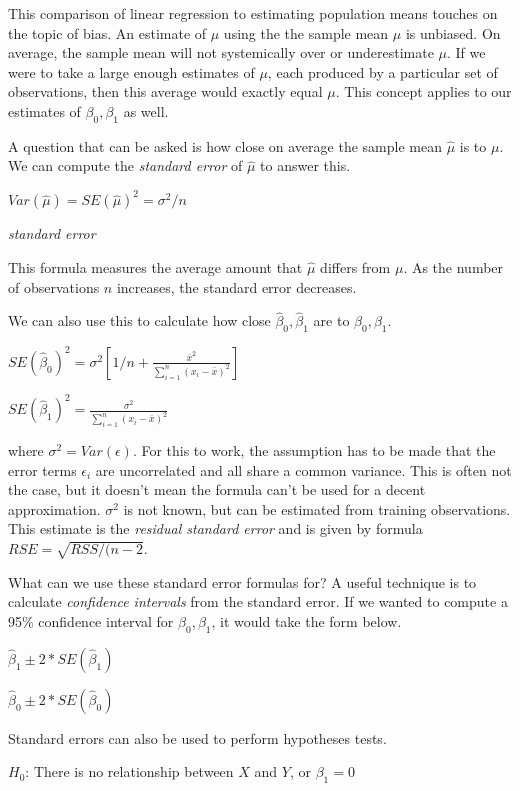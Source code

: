 \documentclass[]{book}
\theoremstyle{definition}
\theoremstyle{definition}
\theoremstyle{definition}
\theoremstyle{remark}
\begin{document}
This comparison of linear regression to estimating population means
touches on the topic of bias. An estimate of \(\mu\) using the the
sample mean \(\hat\mu\) is unbiased. On average, the sample mean will
not systemically over or underestimate \(\mu\). If we were to take a
large enough estimates of \(\mu\), each produced by a particular set of
observations, then this average would exactly equal \(\mu\). This
concept applies to our estimates of \(\beta_0, \beta_1\) as well.

A question that can be asked is how close on average the sample mean
\(\hat\mu\) is to \(\mu\). We can compute the \emph{standard error} of
\(\hat\mu\) to answer this.

\(Var(\hat\mu) = SE(\hat\mu)^2 = \sigma^2/n\)

\emph{standard error}

This formula measures the average amount that \(\hat\mu\) differs from
\(\mu\). As the number of observations \(n\) increases, the standard
error decreases.

We can also use this to calculate how close \(\hat\beta_0, \hat\beta_1\)
are to \(\beta_0, \beta_1\).

\(SE(\hat\beta_0)^2= \sigma^2 \left[1/n + \frac{\displaystyle \bar x^2}{\displaystyle\sum_{i=1}^{n}(x_i - \bar x)^2} \right]\)

\(SE(\hat\beta_1)^2=\frac{\displaystyle \sigma^2}{\displaystyle\sum_{i=1}^{n}(x_i - \bar x)^2}\)

where \(\sigma^2 = Var(\epsilon)\). For this to work, the assumption has
to be made that the error terms \(\epsilon_i\) are uncorrelated and all
share a common variance. This is often not the case, but it doesn't mean
the formula can't be used for a decent approximation. \(\sigma^2\) is
not known, but can be estimated from training observations. This
estimate is the \emph{residual standard error} and is given by formula
\(RSE = \sqrt{RSS/(n-2}\).

What can we use these standard error formulas for? A useful technique is
to calculate \emph{confidence intervals} from the standard error. If we
wanted to compute a 95\% confidence interval for \(\beta_0,\beta_1\), it
would take the form below.

\(\hat\beta_1 \pm 2 * SE(\hat\beta_1)\)

\(\hat\beta_0 \pm 2 * SE(\hat\beta_0)\)

Standard errors can also be used to perform hypotheses tests.

\(H_0\): There is no relationship between \(X\) and \(Y\), or
\(\beta_1 = 0\)
\end{document}
